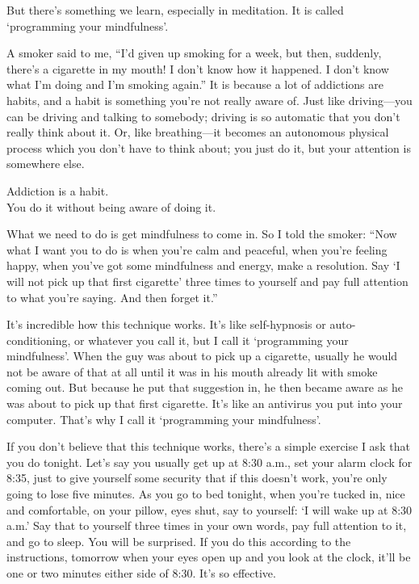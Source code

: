 \documentclass[12pt, openany]{book}
\newenvironment{aphorism}%
{%
\begin{center}\begin{itshape}
}%
{\end{itshape}\end{center}
}%
\begin{document}
But there’s something we learn, especially in meditation. It is called ‘programming your mindfulness’. 

A smoker said to me, “I’d given up smoking for a week, but then, suddenly, there’s a cigarette in my mouth! I don’t know how it happened. I don’t know what I’m doing and I’m smoking again.” It is because a lot of addictions are habits, and a habit is something you’re not really aware of. Just like driving—you can be driving and talking to somebody; driving is so automatic that you don’t really think about it. Or, like breathing—it becomes an autonomous physical process which you don’t have to think about; you just do it, but your attention is somewhere else. 

\begin{aphorism}
Addiction is a habit.\\  
You do it without being aware of doing it.
\end{aphorism}

What we need to do is get mindfulness to come in. So I told the smoker: “Now what I want you to do is when you’re calm and peaceful, when you’re feeling happy, when you’ve got some mindfulness and energy, make a resolution. Say ‘I will not pick up that first cigarette’ three times to yourself and pay full attention to what you’re saying. And then forget it.” 

It’s incredible how this technique works. It’s like self-hypnosis or auto-conditioning, or whatever you call it, but I call it ‘programming your mindfulness’. When the guy was about to pick up a cigarette, usually he would not be aware of that at all until it was in his mouth already lit with smoke coming out. But because he put that suggestion in, he then became aware as he was about to pick up that first cigarette. It’s like an antivirus you put into your computer. That’s why I call it ‘programming your mindfulness’. 

If you don’t believe that this technique works, there’s a simple exercise I ask that you do tonight. Let’s say you usually get up at 8:30 a.m., set your alarm clock for 8:35, just to give yourself some security that if this doesn’t work, you’re only going to lose five minutes. As you go to bed tonight, when you’re tucked in, nice and comfortable, on your pillow, eyes shut, say to yourself: ‘I will wake up at 8:30 a.m.’ Say that to yourself three times in your own words, pay full attention to it, and go to sleep. You will be surprised. If you do this according to the instructions, tomorrow when your eyes open up and you look at the clock, it’ll be one or two minutes either side of 8:30. It’s so effective. 
\end{document}
